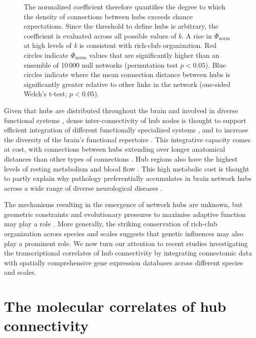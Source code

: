 \begin{figure}[h!]
{The normalized coefficient therefore quantifies the degree to which the density of connections between hubs exceeds chance expectations. Since the threshold to define hubs is arbitrary, the coefficient is evaluated across all possible values of \textit{k}.
A rise in $\Phi_\mathrm{norm}$ at high levels of \textit{k} is consistent with rich-club organization. Red circles indicate $\Phi_\mathrm{norm}$ values that are significantly higher than an ensemble of 10\,000 null networks (permutation test $p < 0.05$).
Blue circles indicate where the mean connection distance between hubs is significantly greater relative to other links in the network (one-sided Welch’s t-test; $p < 0.05$). }\label{fig:Ch3Fig2}
\end{figure}

Given that hubs are distributed throughout the brain and involved in diverse functional systems \citep{DeReus2013b,VandenHeuvel2013a,Fulcher2016}, dense inter-connectivity of hub nodes is thought to support efficient integration of different functionally specialized systems \citep{VandenHeuvel2012}, and to increase the diversity of the brain’s functional repertoire \citep{Senden2014}.
This integrative capacity comes at cost, with connections between hubs extending over longer anatomical distances than other types of connections \citep{VandenHeuvel2011,Harriger2012,Fulcher2016,Arnatkeviciute2018}.
Hub regions also have the highest levels of resting metabolism \citep{Vaishnavi2010,Tomasi2013} and blood flow \citep{Liang2013a}.
This high metabolic cost is thought to partly explain why pathology preferentially accumulates in brain network hubs across a wide range of diverse neurological diseases \citep{Bullmore2012,Crossley2014,Fornito2015}.

The mechanisms resulting in the emergence of network hubs are unknown, but geometric constraints and evolutionary pressures to maximise adaptive function may play a role \citep{Henderson2014,Roberts2016,Betzel2017}. More generally, the striking conservation of rich-club organization across species and scales suggests that genetic influences may also play a prominent role. We now turn our attention to recent studies investigating the transcriptional correlates of hub connectivity by integrating connectomic data with spatially comprehensive gene expression databases across different species and scales.

\section{The molecular correlates of hub connectivity}

